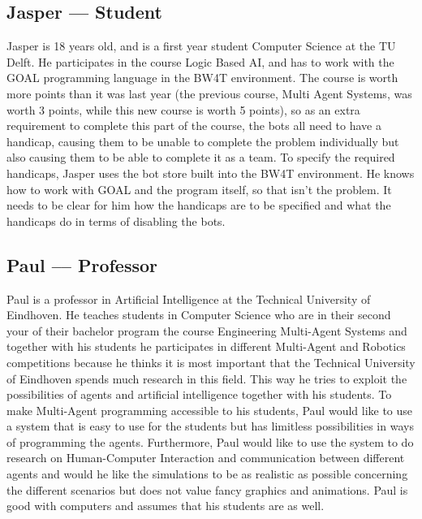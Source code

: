 \subsection*{Jasper --- Student}
Jasper is 18 years old, and is a first year student Computer Science at the TU Delft. He participates in the course Logic Based AI, and has to work with the GOAL programming language in the BW4T environment. The course is worth more points than it was last year (the previous course, Multi Agent Systems, was worth 3 points, while this new course is worth 5 points), so as an extra requirement to complete this part of the course, the bots all need to have a handicap, causing them to be unable to complete the problem individually but also causing them to be able to complete it as a team. To specify the required handicaps, Jasper uses the bot store built into the BW4T environment. 
He knows how to work with GOAL and the program itself, so that isn’t the problem. It needs to be clear for him how the handicaps are to be specified and what the handicaps do in terms of disabling the bots.

\subsection*{Paul –-- Professor}
Paul is a professor in Artificial Intelligence at the Technical University of Eindhoven. He teaches students in Computer Science who are in their second your of their bachelor program the course Engineering Multi-Agent Systems and together with his students he participates in different Multi-Agent and Robotics competitions because he thinks it is most important that the Technical University of Eindhoven spends much research in this field. This way he tries to exploit the possibilities of agents and artificial intelligence together with his students. 
To make Multi-Agent programming accessible to his students, Paul would like to use a system that is easy to use for the students but has limitless possibilities in ways of programming the agents. Furthermore, Paul would like to use the system to do research on Human-Computer Interaction and communication between different agents and would he like the simulations to be as realistic as possible concerning the different scenarios but does not value fancy graphics and animations. Paul is good with computers and assumes that his students are as well. 

\pagebreak